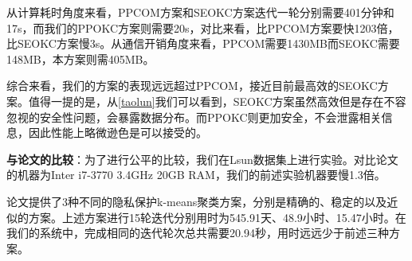 \begin{table}[htbp]
	\centering
	\renewcommand{\arraystretch}{1.3} %
	\caption{scheme comparison ($n=8192,m=5,k=3$)}
	\label{s3-ta-duibi}
\end{table}
从计算耗时角度来看，PPCOM方案和SEOKC方案迭代一轮分别需要401分钟和17s，而我们的PPOKC方案则需要20s，对比来看，比PPCOM方案要快1203倍，比SEOKC方案慢3s。从通信开销角度来看，PPCOM需要1430MB而SEOKC需要148MB，本方案则需405MB。

综合来看，我们的方案的表现远远超过PPCOM，接近目前最高效的SEOKC方案。值得一提的是，从\ref{taolun}我们可以看到，SEOKC方案虽然高效但是存在不容忽视的安全性问题，会暴露数据分布。而PPOKC则更加安全，不会泄露相关信息，因此性能上略微逊色是可以接受的。

\textbf{与论文\cite{jaschke2019unsupervised}的比较}：为了进行公平的比较，我们在Lsun数据集上进行实验。对比论文的机器为Inter i7-3770 3.4GHz 20GB RAM，我们的前述实验机器要慢1.3倍。

论文\cite{jaschke2019unsupervised}提供了3种不同的隐私保护k-means聚类方案，分别是精确的、稳定的以及近似的方案。上述方案进行15轮迭代分别用时为545.91天、48.9小时、15.47小时。在我们的系统中，完成相同的迭代轮次总共需要20.94秒，用时远远少于前述三种方案。

